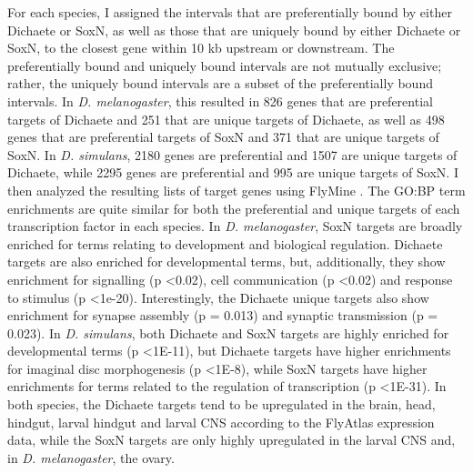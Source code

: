 For each species, I assigned the intervals that are preferentially bound by either Dichaete or SoxN, as well as those that are uniquely bound by either Dichaete or SoxN, to the closest gene within 10 kb upstream or downstream. The preferentially bound and uniquely bound intervals are not mutually exclusive; rather, the uniquely bound intervals are a subset of the preferentially bound intervals. In \emph{D. melanogaster}, this resulted in 826 genes that are preferential targets of Dichaete and 251 that are unique targets of Dichaete, as well as 498 genes that are preferential targets of SoxN and 371 that are unique targets of SoxN. In \emph{D. simulans}, 2180 genes are preferential and 1507 are unique targets of Dichaete, while 2295 genes are preferential and 995 are unique targets of SoxN. I then analyzed the resulting lists of target genes using FlyMine \citep{lyne_flymine:_2007}. The GO:BP term enrichments are quite similar for both the preferential and unique targets of each transcription factor in each species. In \emph{D. melanogaster}, SoxN targets are broadly enriched for terms relating to development and biological regulation. Dichaete targets are also enriched for developmental terms, but, additionally, they show enrichment for signalling (p \textless 0.02), cell communication (p \textless 0.02) and response to stimulus (p \textless 1e-20). Interestingly, the Dichaete unique targets also show enrichment for synapse assembly (p = 0.013) and synaptic transmission (p = 0.023). In \emph{D. simulans}, both Dichaete and SoxN targets are highly enriched for developmental terms (p \textless 1E-11), but Dichaete targets have higher enrichments for imaginal disc morphogenesis (p \textless 1E-8), while SoxN targets have higher enrichments for terms related to the regulation of transcription (p \textless 1E-31). In both species, the Dichaete targets tend to be upregulated in the brain, head, hindgut, larval hindgut and larval CNS according to the FlyAtlas expression data, while the SoxN targets are only highly upregulated in the larval CNS and, in \emph{D. melanogaster}, the ovary.

